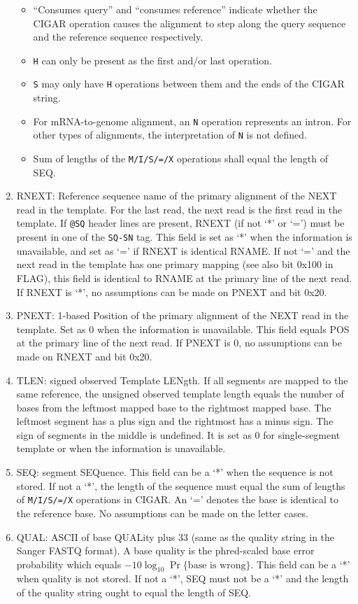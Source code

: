\documentclass[10pt]{article}
\begin{document}
\begin{enumerate}
\begin{itemize}
  \item ``Consumes query'' and ``consumes reference'' indicate
    whether the CIGAR operation causes the alignment to step along the
    query sequence and the reference sequence respectively.
  \item {\tt H} can only be present as the first and/or last operation.
  \item {\tt S} may only have {\tt H} operations between them and the
    ends of the {\sf CIGAR} string.
  \item For mRNA-to-genome alignment, an {\tt N} operation represents an
    intron. For other types of alignments, the interpretation of {\tt N}
    is not defined.
  \item Sum of lengths of the {\tt M/I/S/=/X} operations shall equal
    the length of {\sf SEQ}.
  \end{itemize}
\item {\sf RNEXT}: Reference sequence name of the primary alignment of the NEXT read in the
  template. For the last read, the next read is the first
  read in the template. If {\tt @SQ} header lines are present, {\sf
    RNEXT} (if not `*' or `=') must be present in one of the {\tt SQ-SN}
  tag. This field is set as `*' when the information is unavailable, and
  set as `=' if {\sf RNEXT} is identical {\sf RNAME}. If not `=' and the
  next read in the template has one primary mapping (see also bit
  0x100 in {\sf FLAG}), this field is identical to {\sf RNAME} at the primary line of the
  next read.  If {\sf
    RNEXT} is `*', no assumptions can be made on {\sf PNEXT} and bit
  0x20.
\item {\sf PNEXT}: 1-based Position of the primary alignment of the NEXT read in the template. Set as
  0 when the information is unavailable. This field equals {\sf POS} at the primary line of
  the next read. If {\sf PNEXT} is 0, no assumptions can be made on
  {\sf RNEXT} and bit 0x20.
\item {\sf TLEN}: signed observed Template LENgth. If all segments are
  mapped to the same reference, the unsigned observed template length
  equals the number of bases from the leftmost mapped base to the
  rightmost mapped base. The leftmost segment has a plus sign and the
  rightmost has a minus sign. The sign of segments in the middle is
  undefined. It is set as 0 for single-segment template or when the
  information is unavailable.
\item {\sf SEQ}: segment SEQuence. This field can be a `*' when the
  sequence is not stored. If not a `*', the length of the sequence must
  equal the sum of lengths of {\tt M/I/S/=/X} operations in {\sf CIGAR}.
  An `=' denotes the base is identical to the reference base. No
  assumptions can be made on the letter cases.
\item {\sf QUAL}: ASCII of base QUALity plus 33 (same as the quality
  string in the Sanger FASTQ format). A base quality is the phred-scaled
  base error probability which equals $-10\log_{10}\Pr\{\mbox{base is
    wrong}\}$. This field can be a `*' when quality is not stored. If
  not a `*', {\sf SEQ} must not be a `*' and the length of the quality string
  ought to equal the length of {\sf SEQ}.
\end{enumerate}
\end{document}
